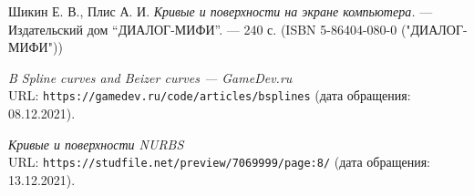 \begin{thebibliography}{99}

Шикин Е. В., Плис А. И. {\itshape Кривые и поверхности на экране компьютера.} --- Издательский дом \enquote{ДИАЛОГ-МИФИ}. --- 240 с. (ISBN 5-86404-080-0 ("ДИАЛОГ-МИФИ"))

{\itshape B Spline curves and Beizer curves --- GameDev.ru} \\URL: \texttt{https://gamedev.ru/code/articles/bsplines} (дата обращения: 08.12.2021).

{\itshape Кривые и поверхности NURBS} \\URL: \texttt{https://studfile.net/preview/7069999/page:8/} (дата обращения: 13.12.2021).

\end{thebibliography}
\pagebreak

